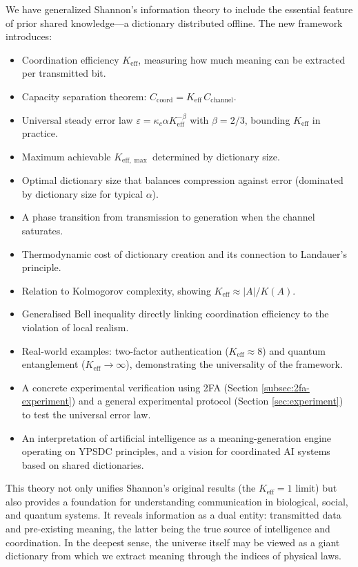 \documentclass[12pt,a4paper]{article}
\theoremstyle{remark}
\newcommand{\Keff}{K_{\mathrm{eff}}}
\newcommand{\Keffmax}{K_{\mathrm{eff},\max}}
\begin{document}
	We have generalized Shannon's information theory to include the essential feature of prior shared knowledge---a dictionary distributed offline. The new framework introduces:
	\begin{itemize}
		\item Coordination efficiency $\Keff$, measuring how much meaning can be extracted per transmitted bit.
		\item Capacity separation theorem: $C_{\text{coord}} = \Keff \, C_{\text{channel}}$.
		\item Universal steady error law $\varepsilon = \kappa_c\alpha K_{\mathrm{eff}}^{-\beta}$ with $\beta=2/3$, bounding $\Keff$ in practice.
		\item Maximum achievable $\Keffmax$ determined by dictionary size.
		\item Optimal dictionary size that balances compression against error (dominated by dictionary size for typical $\alpha$).
		\item A phase transition from transmission to generation when the channel saturates.
		\item Thermodynamic cost of dictionary creation and its connection to Landauer's principle.
		\item Relation to Kolmogorov complexity, showing $\Keff \approx |A|/K(A)$.
		\item Generalised Bell inequality directly linking coordination efficiency to the violation of local realism.
		\item Real-world examples: two-factor authentication ($\Keff \approx 8$) and quantum entanglement ($\Keff \to \infty$), demonstrating the universality of the framework.
		\item A concrete experimental verification using 2FA (Section \ref{subsec:2fa-experiment}) and a general experimental protocol (Section \ref{sec:experiment}) to test the universal error law.
		\item An interpretation of artificial intelligence as a meaning-generation engine operating on YPSDC principles, and a vision for coordinated AI systems based on shared dictionaries.
	\end{itemize}
	
	This theory not only unifies Shannon's original results (the $\Keff=1$ limit) but also provides a foundation for understanding communication in biological, social, and quantum systems. It reveals information as a dual entity: transmitted data and pre-existing meaning, the latter being the true source of intelligence and coordination. In the deepest sense, the universe itself may be viewed as a giant dictionary from which we extract meaning through the indices of physical laws.
	
\end{document}
